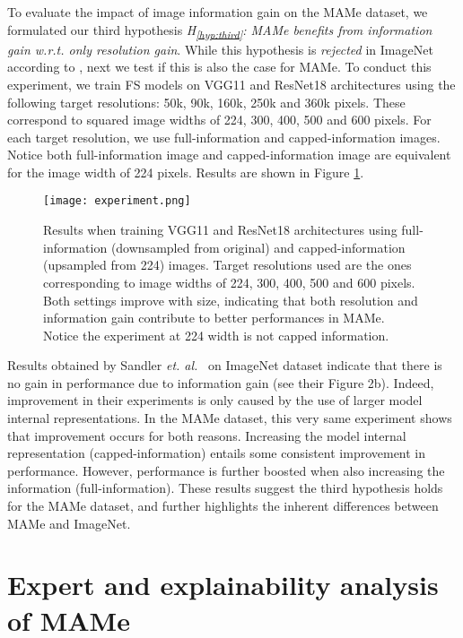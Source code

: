 \documentclass{article}
\newcommand{\hypref}[1]{\textup{H\textsubscript{\ref{#1}}}}
\newcommand{\wrt}{{\it w.r.t. }}    \newcommand{\eg}{\emph{e.g.}, }     \newcommand{\ie}{\emph{i.e.}, }     \newcommand{\etal}{\emph{et al.}}   \newcommand\etc{\emph{etc.}}
\begin{document}
To evaluate the impact of image information gain on the MAMe dataset, we formulated our third hypothesis \textit{\hypref{hyp:third}: MAMe benefits from information gain \wrt only resolution gain}. While this hypothesis is \textit{rejected} in ImageNet according to \citep{sandler2019nondiscriminative}, next we test if this is also the case for MAMe. To conduct this experiment, we train FS models on VGG11 and ResNet18 architectures using the following target resolutions: 50k, 90k, 160k, 250k and 360k pixels. These correspond to squared image widths of 224, 300, 400, 500 and 600 pixels. For each target resolution, we use full-information and capped-information images. Notice both full-information image and capped-information image are equivalent for the image width of 224 pixels. Results are shown in Figure \ref{fig:hyp3}.

\begin{figure}[t]
    \centering
    \texttt{[image: experiment.png]}
    \caption{Results when training VGG11 and ResNet18 architectures using full-information (downsampled from original) and capped-information (upsampled from 224) images. Target resolutions used are the ones corresponding to image widths of 224, 300, 400, 500 and 600 pixels. Both settings improve with size, indicating that both resolution and information gain contribute to better performances in MAMe. Notice the experiment at 224 width is not capped information.}
    \label{fig:hyp3}
\end{figure}

Results obtained by Sandler \textit{et. al.}~\citep{sandler2019nondiscriminative} on ImageNet dataset \citep{russakovsky2015imagenet} indicate that there is no gain in performance due to information gain (see their Figure 2b). Indeed, improvement in their experiments is only caused by the use of larger model internal representations. In the MAMe dataset, this very same experiment shows that improvement occurs for both reasons. Increasing the model internal representation (capped-information) entails some consistent improvement in performance. However, performance is further boosted when also increasing the information (full-information). These results suggest the third hypothesis holds for the MAMe dataset, and further highlights the inherent differences between MAMe and ImageNet.


\section{Expert and explainability analysis of MAMe}\label{sec:exp}
\end{document}
